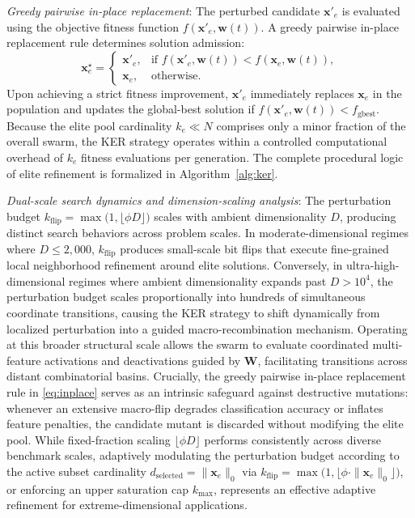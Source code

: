 \textit{Greedy pairwise in-place replacement}: The perturbed candidate $\mathbf{x}'_e$ is evaluated using the objective fitness function $f(\mathbf{x}'_e, \mathbf{w}(t))$. A greedy pairwise in-place replacement rule determines solution admission:
\begin{equation}
\mathbf{x}_e^{\star} = \begin{cases}
\mathbf{x}'_e, & \text{if } f(\mathbf{x}'_e, \mathbf{w}(t)) < f(\mathbf{x}_e, \mathbf{w}(t)), \\[2pt]
\mathbf{x}_e, & \text{otherwise}.
\end{cases}
\label{eq:inplace}
\end{equation}
Upon achieving a strict fitness improvement, $\mathbf{x}'_e$ immediately replaces $\mathbf{x}_e$ in the population and updates the global-best solution if $f(\mathbf{x}'_e, \mathbf{w}(t)) < f_{\mathrm{gbest}}$. Because the elite pool cardinality $k_e \ll N$ comprises only a minor fraction of the overall swarm, the KER strategy operates within a controlled computational overhead of $k_e$ fitness evaluations per generation. The complete procedural logic of elite refinement is formalized in Algorithm~\ref{alg:ker}.

\textit{Dual-scale search dynamics and dimension-scaling analysis}: The perturbation budget $k_{\mathrm{flip}} = \max\bigl(1, \lfloor \phi D \rfloor\bigr)$ scales with ambient dimensionality $D$, producing distinct search behaviors across problem scales. In moderate-dimensional regimes where $D \le 2{,}000$, $k_{\mathrm{flip}}$ produces small-scale bit flips that execute fine-grained local neighborhood refinement around elite solutions. Conversely, in ultra-high-dimensional regimes where ambient dimensionality expands past $D > 10^4$, the perturbation budget scales proportionally into hundreds of simultaneous coordinate transitions, causing the KER strategy to shift dynamically from localized perturbation into a guided macro-recombination mechanism. Operating at this broader structural scale allows the swarm to evaluate coordinated multi-feature activations and deactivations guided by $\mathbf{W}$, facilitating transitions across distant combinatorial basins. Crucially, the greedy pairwise in-place replacement rule in \eqref{eq:inplace} serves as an intrinsic safeguard against destructive mutations: whenever an extensive macro-flip degrades classification accuracy or inflates feature penalties, the candidate mutant is discarded without modifying the elite pool. While fixed-fraction scaling $\lfloor \phi D \rfloor$ performs consistently across diverse benchmark scales, adaptively modulating the perturbation budget according to the active subset cardinality $d_{\mathrm{selected}} = \|\mathbf{x}_e\|_0$ via $k_{\mathrm{flip}} = \max\bigl(1, \lfloor \phi \cdot \|\mathbf{x}_e\|_0 \rfloor\bigr)$, or enforcing an upper saturation cap $k_{\max}$, represents an effective adaptive refinement for extreme-dimensional applications.

